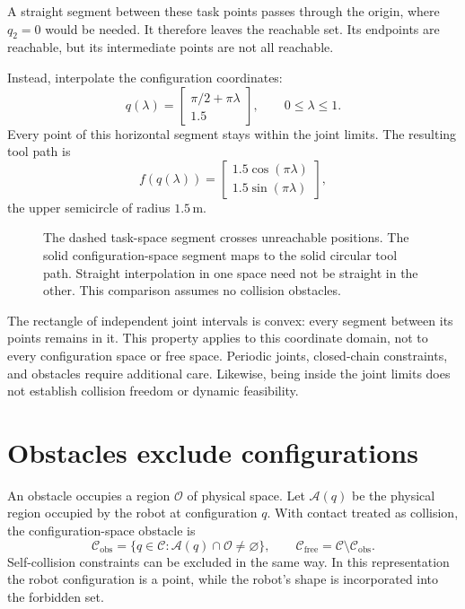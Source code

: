 A straight segment between these task points passes through the origin,
where $q_2=0$ would be needed. It therefore leaves the reachable set.
Its endpoints are reachable, but its intermediate points are not all
reachable.

Instead, interpolate the configuration coordinates:
\[
 q(\lambda)=\begin{bmatrix}\pi/2+\pi\lambda\\1.5\end{bmatrix},
 \qquad0\le\lambda\le1.
\]
Every point of this horizontal segment stays within the joint limits.
The resulting tool path is
\begin{equation}
 f(q(\lambda))=
 \begin{bmatrix}1.5\cos(\pi\lambda)\\1.5\sin(\pi\lambda)\end{bmatrix},
 \label{eq:l11-arc}
\end{equation}
the upper semicircle of radius $1.5\,\mathrm m$.

\begin{figure}[htbp]
\centering
\caption{The dashed task-space segment crosses unreachable positions.
The solid configuration-space segment maps to the solid circular tool
path. Straight interpolation in one space need not be straight in the
other. This comparison assumes no collision obstacles.}
\label{fig:l11-paths}
\end{figure}

The rectangle of independent joint intervals is convex: every segment
between its points remains in it. This property applies to this coordinate
domain, not to every configuration space or free space. Periodic joints,
closed-chain constraints, and obstacles require additional care. Likewise,
being inside the joint limits does not establish collision freedom or
dynamic feasibility.

\section{Obstacles exclude configurations}
An obstacle occupies a region $\mathcal O$ of physical space. Let
$\mathcal A(q)$ be the physical region occupied by the robot at configuration
$q$. With contact treated as collision, the configuration-space obstacle is
\begin{equation}
 \mathcal C_{\mathrm{obs}}=
 \{q\in\mathcal C:\mathcal A(q)\cap\mathcal O\ne\varnothing\},
 \qquad
 \mathcal C_{\mathrm{free}}=\mathcal C\setminus\mathcal C_{\mathrm{obs}}.
 \label{eq:l11-cobs}
\end{equation}
Self-collision constraints can be excluded in the same way. In this
representation the robot configuration is a point, while the robot's
shape is incorporated into the forbidden set.

